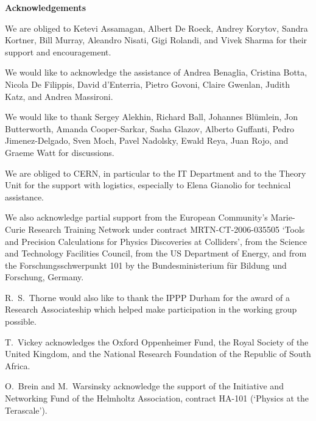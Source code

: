 
\begin{flushleft}
{\bf Acknowledgements}
\end{flushleft}

We are obliged to 
Ketevi Assamagan, 
Albert De Roeck,
Andrey Korytov,
Sandra Kortner, 
Bill Murray, 
Aleandro Nisati, 
Gigi Rolandi, and
Vivek Sharma
for their support and encouragement.

We would like to acknowledge the assistance of
Andrea Benaglia, 
Cristina Botta, 
Nicola De Filippis,  
David d'Enterria,
Pietro Govoni,
Claire Gwenlan,
Judith Katz,
and Andrea Massironi. 

We would like to thank Sergey Alekhin, Richard Ball, Johannes Bl\"umlein,
Jon Butterworth, Amanda Cooper-Sarkar, Sasha Glazov,
Alberto Guffanti, Pedro Jimenez-Delgado, Sven Moch, Pavel Nadolsky,
Ewald Reya, Juan Rojo, and Graeme Watt for discussions. 

We are obliged to CERN, in particular to the IT Department and to the
Theory Unit for the support with logistics, especially to Elena Gianolio for
technical assistance.

We also acknowledge partial support from the European Community's Marie-Curie
Research Training Network under contract MRTN-CT-2006-035505 `Tools
and Precision Calculations for Physics Discoveries at Colliders',
from the Science and Technology Facilities Council, 
from the US Department of Energy,
and
from the Forschungsschwerpunkt 101
by the Bundesministerium f\"ur Bildung und Forschung, Germany.

R.~S.~Thorne would also like to thank the IPPP Durham for the award of a
Research Associateship which helped make participation in the working
group possible. 

T.~Vickey acknowledges
the Oxford Oppenheimer Fund,
the Royal Society of the United Kingdom,
and the National Research Foundation of the Republic of South Africa.

O.~Brein and M.~Warsinsky acknowledge the support of the Initiative and 
Networking Fund of the Helmholtz Association, contract HA-101
(`Physics at the Terascale').


